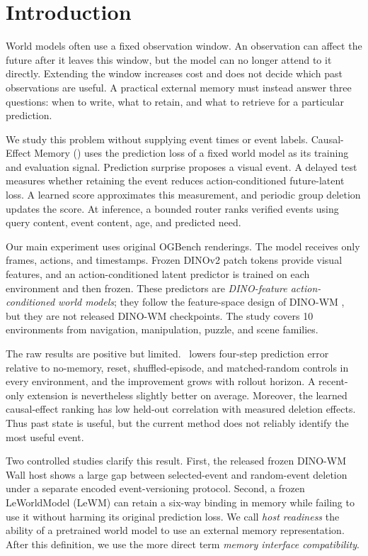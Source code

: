 \section{Introduction}

World models often use a fixed observation window. An observation can affect
the future after it leaves this window, but the model can no longer attend to
it directly. Extending the window increases cost and does not decide which
past observations are useful. A practical external memory must instead answer
three questions: when to write, what to retain, and what to retrieve for a
particular prediction.

We study this problem without supplying event times or event labels.
Causal-Effect Memory (\cem) uses the prediction loss of a fixed world model as
its training and evaluation signal. Prediction surprise proposes a visual
event. A delayed test measures whether retaining the event reduces
action-conditioned future-latent loss. A learned score approximates this
measurement, and periodic group deletion updates the score. At inference, a
bounded router ranks verified events using query content, event content, age,
and predicted need.

Our main experiment uses original OGBench renderings. The model receives only
frames, actions, and timestamps. Frozen DINOv2 patch tokens provide visual
features, and an action-conditioned latent predictor is trained on each
environment and then frozen. These predictors are \emph{DINO-feature
action-conditioned world models}; they follow the feature-space design of
DINO-WM \citep{r_dinowm}, but they are not released DINO-WM checkpoints.
The study covers 10 environments from navigation, manipulation, puzzle, and
scene families.

The raw results are positive but limited. \cem\ lowers four-step prediction
error relative to no-memory, reset, shuffled-episode, and matched-random
controls in every environment, and the improvement grows with rollout
horizon. A recent-only extension is nevertheless slightly better on average.
Moreover, the learned causal-effect ranking has low held-out correlation with
measured deletion effects. Thus past state is useful, but the current method
does not reliably identify the most useful event.

Two controlled studies clarify this result. First, the released frozen
DINO-WM Wall host shows a large gap between selected-event and random-event
deletion under a separate encoded event-versioning protocol. Second, a frozen
LeWorldModel (LeWM) \citep{r_lewm} can retain a six-way binding in memory while
failing to use it without harming its original prediction loss. We call
\emph{host readiness} the ability of a pretrained world model to use an
external memory representation. After this definition, we use the more direct
term \emph{memory interface compatibility}.

